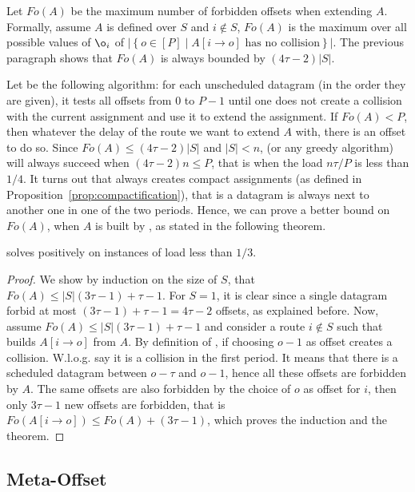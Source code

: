 Let $Fo(A)$ be the maximum number of forbidden offsets when extending $A$. Formally, assume $A$ is defined over $S$ and $i\notin S$, $Fo(A)$ is the maximum over all possible values of $\o_i$ of $|\left\{ o \in [P] \mid A[i \rightarrow o] \text{ has no collision}\right\}|$. The previous paragraph shows that $Fo(A)$ is always bounded by $(4 \tau -2)|S|$. 



Let \firstfit be the following algorithm:  for each unscheduled datagram (in the order they are given), it tests all offsets from $0$ to $P-1$ until one does not create a collision with the current assignment and use it to extend the assignment. If $Fo(A) < P$, then whatever the delay of the route we want to extend $A$ with, there is an offset to do so. Since $Fo(A) \leq (4 \tau -2)|S|$ and $|S| < n$, \firstfit (or any greedy algorithm) will always succeed when $(4 \tau -2)n \leq P$, that is when the load $ n\tau /P$ is less than $1/4$.
It turns out that \firstfit always creates compact assignments (as defined in Proposition~\ref{prop:compactification}), that is a datagram is always next to another one in one of the two periods. Hence, we can prove a better bound on $Fo(A)$, when $A$ is built by \firstfit, as stated in the following theorem.

\begin{theorem}
\firstfit solves \pma positively on instances of load less than $1/3$. 
\end{theorem}
\begin{proof}
We show by induction on the size of $S$, that $Fo(A) \leq |S|(3\tau -1) + \tau -1$. For $S = 1$, it is clear since a single datagram forbid at most $(3\tau -1) + \tau -1 = 4\tau-2$ offsets, as explained before. Now, assume $Fo(A) \leq |S|(3\tau -1) + \tau -1$ and consider a route $i \notin S$ such that \firstfit builds $A[i \rightarrow o]$ from $A$. By definition of \firstfit, if choosing $o-1$ as offset creates a collision. W.l.o.g. say it is a collision in the first period. It means that there is a scheduled datagram between $o - \tau $ and $o-1$, hence all these offsets are forbidden by $A$. The same offsets are also forbidden by the choice of $o$ as offset for $i$, then only $3\tau -1$ new offsets are forbidden, that is $Fo(A[i \rightarrow o]) \leq Fo(A) + (3\tau -1)$, which proves the induction and the theorem.
\end{proof}

\subsection{Meta-Offset}

